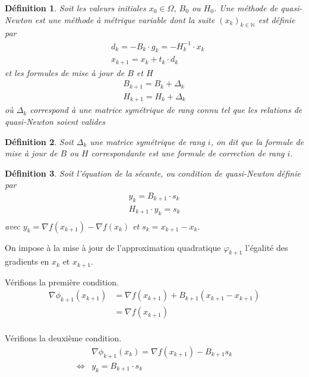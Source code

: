 \documentclass[3p, twocolumn]{elsarticle}
\newtheorem{definition}{Définition}[section]
\begin{document}
\begin{definition}
    Soit les valeurs initiales $x_0\in \Omega$, $B_0$ ou $H_0$. Une méthode de quasi-Newton est une méthode à métrique variable dont la suite $(x_k)_{k\in \mathbb{N}}$ est définie par
    \begin{align*}
        &d_k = -B_k\cdot g_k = -H_k^{-1}\cdot x_k \\
        &x_{k+1} = x_k + t_k\cdot d_k
    \end{align*}
    et les formules de mise à jour de $B$ et $H$
    \begin{align}
        B_{k+1} = B_k + \Delta_k
        \label{eq:maj-bk}\\
        H_{k+1} = H_k + \Delta_k
        \label{eq:maj-hk}
    \end{align}
    où $\Delta_k$ correspond à une matrice symétrique de rang connu tel que les relations de quasi-Newton soient valides 
\end{definition}

\begin{definition}
    Soit $\Delta_k$ une matrice symétrique de rang $i$, on dit que la formule de mise à jour de $B$ ou $H$ correspondante est une formule de correction de rang $i$. 
\end{definition}

\begin{definition}
    Soit l'équation de la sécante, ou condition de quasi-Newton définie par 
    \begin{align}
        y_k = B_{k+1} \cdot s_k
        \label{eq:sec-qn-bk}\\
        H_{k+1} \cdot y_k = s_k
        \label{eq:sec-qn-bk}\\
    \end{align}
    avec $y_k = \nabla f(x_{k+1}) - \nabla f(x_k)$ et $s_k = x_{k+1} - x_k$.
\end{definition}
\begin{pf}
    On impose à la mise à jour de l'approximation quadratique $\varphi_{k+1}$ l'égalité des gradients en $x_k$ et $x_{k+1}$.
    
    Vérifions la première condition.
    \begin{align*}
        \nabla \phi_{k+1}(x_{k+1}) &= \nabla f(x_{k+1}) + B_{k+1}(x_{k+1} - x_{k+1}) \\
        &= \nabla f(x_{k+1})\\
    \end{align*}

    Vérifions la deuxième condition.
    \begin{align*}
        &\nabla \phi_{k+1}(x_{k}) = \nabla f(x_{k+1}) - B_{k+1}s_k \\
        \iff& y_k = B_{k+1}\cdot s_k
    \end{align*}
\end{pf}
\end{document}
